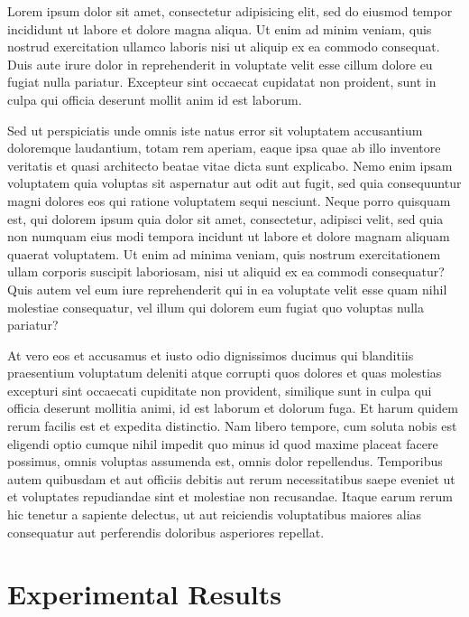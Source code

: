 \documentclass[ijoc,nonblindrev]{informs3} %
\begin{document}
Lorem ipsum dolor sit amet, consectetur adipisicing elit, sed do eiusmod
tempor incididunt ut labore et dolore magna aliqua. Ut enim ad minim
veniam, quis nostrud exercitation ullamco laboris nisi ut aliquip ex ea
commodo consequat. Duis aute irure dolor in reprehenderit in voluptate
velit esse cillum dolore eu fugiat nulla pariatur. Excepteur sint
occaecat cupidatat non proident, sunt in culpa qui officia deserunt
mollit anim id est laborum.

Sed ut perspiciatis unde omnis iste natus error sit voluptatem
accusantium doloremque laudantium, totam rem aperiam, eaque ipsa quae ab
illo inventore veritatis et quasi architecto beatae vitae dicta sunt
explicabo. Nemo enim ipsam voluptatem quia voluptas sit aspernatur aut
odit aut fugit, sed quia consequuntur magni dolores eos qui ratione
voluptatem sequi nesciunt. Neque porro quisquam est, qui dolorem ipsum
quia dolor sit amet, consectetur, adipisci velit, sed quia non numquam
eius modi tempora incidunt ut labore et dolore magnam aliquam quaerat
voluptatem. Ut enim ad minima veniam, quis nostrum exercitationem ullam
corporis suscipit laboriosam, nisi ut aliquid ex ea commodi consequatur?
Quis autem vel eum iure reprehenderit qui in ea voluptate velit esse
quam nihil molestiae consequatur, vel illum qui dolorem eum fugiat quo
voluptas nulla pariatur?

At vero eos et accusamus et iusto odio dignissimos ducimus qui
blanditiis praesentium voluptatum deleniti atque corrupti quos dolores
et quas molestias excepturi sint occaecati cupiditate non provident,
similique sunt in culpa qui officia deserunt mollitia animi, id est
laborum et dolorum fuga. Et harum quidem rerum facilis est et expedita
distinctio. Nam libero tempore, cum soluta nobis est eligendi optio
cumque nihil impedit quo minus id quod maxime placeat facere possimus,
omnis voluptas assumenda est, omnis dolor repellendus. Temporibus autem
quibusdam et aut officiis debitis aut rerum necessitatibus saepe eveniet
ut et voluptates repudiandae sint et molestiae non recusandae. Itaque
earum rerum hic tenetur a sapiente delectus, ut aut reiciendis
voluptatibus maiores alias consequatur aut perferendis doloribus
asperiores repellat.

\section{Experimental Results}

\end{document}
